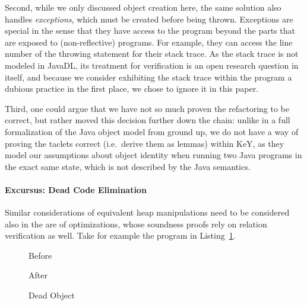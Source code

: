 Second, while we only discussed object creation here, the same solution also handles \emph{exceptions}, which must be created before being thrown. 
Exceptions are special in the sense that they have access to the program beyond the parts that are exposed to (non-reflective) programs.
For example, they can access the line number of the throwing statement for their stack trace.
As the stack trace is not modeled in JavaDL, its treatment for verification is an open research question in itself, and because we consider exhibiting the stack trace
within the program a dubious practice in the first place, we chose to ignore it in this paper.

Third, one could argue that we have not so much proven the refactoring to be correct,
but rather moved this decision further down the chain: unlike in a full formalization of the Java object model from ground up, 
we do not have a way of proving the taclets correct (i.e.\ derive them as lemmas) within KeY, as they model our assumptions about object identity when running two Java programs in the exact same state, which is not described by the Java semantics.


\paragraph*{Excursus: Dead Code Elimination}
Similar considerations of equivalent heap manipulations need to be considered also in the are of optimizations, whose soundness proofs rely on relation verification as well.
Take for example the program in Listing~\ref{lst:xisnewxisnew}.
\begin{figure}[tbp]
  \captionsetup{type=lstlisting}
  \centering
  \begin{sublstlisting}[b]{.2\linewidth}
    
    \caption{Before}
  \end{sublstlisting}\hspace{1cm}
  \begin{sublstlisting}[b]{.2\linewidth}
    
    \caption{After}
  \end{sublstlisting}
  \caption{Dead Object}
  \label{lst:xisnewxisnew}
\end{figure}

